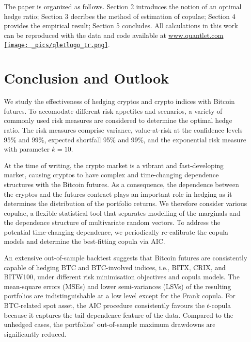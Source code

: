 \documentclass[11pt,a4paper,english]{article}
\begin{document}
The paper is organized as follows. Section 2 introduces the notion of
an optimal hedge ratio; Section 3 decribes the method of estimation of
copulae; Section 4 provides the empirical result; Section 5
concludes. 
All calculations in this work can be reproduced with the data and code
available at \href{http://www.quantlet.com/}{www.quantlet.com
  {\texttt{[image: \_pics/qletlogo\_tr.png]}}}. 



%


\section{Conclusion and Outlook}\label{sec:conclusion-and-outlook}
We study the effectiveness of hedging cryptos and crypto indices with
Bitcoin futures.
To accomodate different risk appetites and scenarios, a variety of
commonly used risk measures are considered to determine the optimal
hedge ratio. The risk measures comprise variance, value-at-risk at
the confidence levels 95\% and 99\%, expected shortfall 95\% and 99\%,
and the exponential risk measure with parameter $k=10$.

At the time of writing, the crypto market is a vibrant and
fast-developing market, causing cryptos to have complex and
time-changing dependence structures with the Bitcoin futures.
As a consequence, the dependence between the cryptos and the futures
contract plays an important role in hedging as it determines the
distribution of the portfolio returns. We therefore consider various
copulae, a flexible statistical tool that separates modelling of the
marginals and the dependence structure of multivariate random
vectors. To address the potential time-changing dependence, we
periodically re-calibrate the copula models and determine the
best-fitting copula via AIC. 

An extensive out-of-sample backtest suggests that Bitcoin futures
are consistently capable of hedging BTC and BTC-involved indices,
i.e., BITX, CRIX, and BITW100, under different risk minimisation
objectives 
and copula models. The mean-square errors (MSEs) and lower
semi-variances (LSVs) of the resulting portfolios are
indistinguishable at a low level except for the Frank copula. 
For BTC-related spot asset, the AIC procedure consistently
favours the $t$-copula because it  
captures the tail dependence feature of the data. 
Compared to the unhedged cases, the
portfolios' out-of-sample maximum drawdowns are significantly reduced. 
\end{document}
